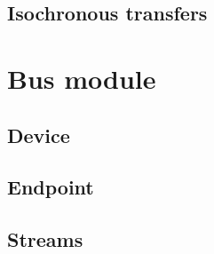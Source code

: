 
\subsection{Isochronous transfers}


\section{Bus module}


\subsection{Device}


\subsection{Endpoint}


\subsection{Streams}

